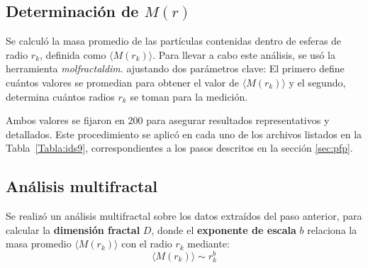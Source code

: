 	
	
	
	\subsection{Determinaci\'{o}n de $M(r)$}
	
	Se calcul\'{o} la masa promedio de las part\'{i}culas contenidas dentro de esferas de radio $r_k$, definida como $\langle M(r_{k}) \rangle$. 
	Para llevar a cabo este an\'{a}lisis, se us\'{o} la herramienta \textit{molfractaldim}. ajustando dos par\'{a}metros clave: El primero define cu\'{a}ntos valores se promedian para obtener el valor de $\langle M(r_{k}) \rangle$ y el segundo, determina cu\'{a}ntos radios $r_{k}$ se toman para la medici\'{o}n.
	
	Ambos valores se fijaron en 200 para asegurar resultados representativos y detallados. Este procedimiento se aplic\'{o} en cada uno de los archivos listados en la Tabla~\ref{Tabla:ids9}, correspondientes a los pasos descritos en la secci\'{o}n \ref{sec:pfp}.
	
	

	
	
	\subsection{An\'{a}lisis multifractal}
	
	Se realiz\'{o} un an\'{a}lisis multifractal sobre los datos extra\'{i}dos del paso anterior, para calcular la \textbf{dimensi\'{o}n fractal} $D$, donde el \textbf{exponente de escala} $b$  relaciona la masa  promedio $\langle M(r_{k}) \rangle$ con el radio $r_{k}$ mediante:
	\begin{equation}
		\langle M(r_{k}) \rangle \sim r_{k}^b
	\end{equation}
	
